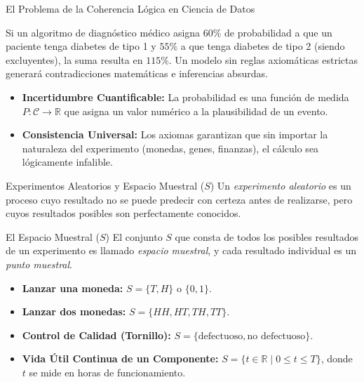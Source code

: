 \begin{frame}{El Problema de la Coherencia Lógica en Ciencia de Datos}
  \begin{motivacion}
    Si un algoritmo de diagnóstico médico asigna $60\%$ de probabilidad a que un paciente tenga diabetes de tipo 1 y $55\%$ a que tenga diabetes de tipo 2 (siendo excluyentes), la suma resulta en $115\%$. Un modelo sin reglas axiomáticas estrictas generará contradicciones matemáticas e inferencias absurdas.
  \end{motivacion}
  
  \vspace{0.4em}
  \pause
  \begin{itemize}
    \item \textbf{Incertidumbre Cuantificable:} La probabilidad es una función de medida $P: \mathcal{C} \to \mathbb{R}$ que asigna un valor numérico a la plausibilidad de un evento. \pause
    \item \textbf{Consistencia Universal:} Los axiomas garantizan que sin importar la naturaleza del experimento (monedas, genes, finanzas), el cálculo sea lógicamente infalible.
  \end{itemize}
\end{frame}

\begin{frame}{Experimentos Aleatorios y Espacio Muestral ($S$)}
  Un \emph{experimento aleatorio} es un proceso cuyo resultado no se puede predecir con certeza antes de realizarse, pero cuyos resultados posibles son perfectamente conocidos. \pause

  \vspace{0.3em}
  \begin{block}{El Espacio Muestral ($S$)}
    El conjunto $S$ que consta de todos los posibles resultados de un experimento es llamado \emph{espacio muestral}, y cada resultado individual es un \emph{punto muestral}.
  \end{block}

  \vspace{0.3em}
  \pause
  \begin{itemize}
    \item \textbf{Lanzar una moneda:} $S = \{T, H\}$ o $\{0, 1\}$. \pause
    \item \textbf{Lanzar dos monedas:} $S = \{HH, HT, TH, TT\}$. \pause
    \item \textbf{Control de Calidad (Tornillo):} $S = \{\text{defectuoso}, \text{no defectuoso}\}$. \pause
    \item \textbf{Vida Útil Continua de un Componente:} $S = \{t \in \mathbb{R} \mid 0 \leq t \leq T\}$, donde $t$ se mide en horas de funcionamiento.
  \end{itemize}
\end{frame}

